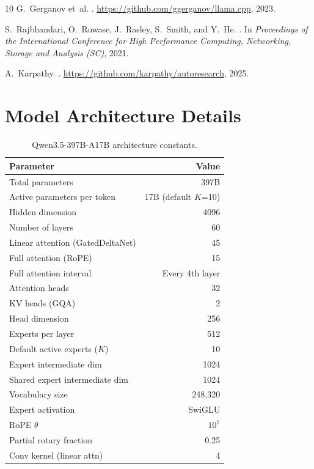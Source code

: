 \documentclass[11pt,twocolumn]{article}
\begin{document}
\begin{thebibliography}{10}
G.~Gerganov et~al.
.
\newblock \url{https://github.com/ggerganov/llama.cpp}, 2023.

S.~Rajbhandari, O.~Ruwase, J.~Rasley, S.~Smith, and Y.~He.
.
\newblock In \emph{Proceedings of the International Conference for High Performance Computing, Networking, Storage and Analysis (SC)}, 2021.

A.~Karpathy.
.
\newblock \url{https://github.com/karpathy/autoresearch}, 2025.

\end{thebibliography}

\appendix

\section{Model Architecture Details}

\begin{table}[h]
\centering
\small
\caption{Qwen3.5-397B-A17B architecture constants.}
\begin{tabular}{@{}lr@{}}
\toprule
\textbf{Parameter} & \textbf{Value} \\
\midrule
Total parameters & 397B \\
Active parameters per token & 17B (default $K$=10) \\
Hidden dimension & 4096 \\
Number of layers & 60 \\
\quad Linear attention (GatedDeltaNet) & 45 \\
\quad Full attention (RoPE) & 15 \\
Full attention interval & Every 4th layer \\
Attention heads & 32 \\
KV heads (GQA) & 2 \\
Head dimension & 256 \\
Experts per layer & 512 \\
Default active experts ($K$) & 10 \\
Expert intermediate dim & 1024 \\
Shared expert intermediate dim & 1024 \\
Vocabulary size & 248{,}320 \\
Expert activation & SwiGLU \\
RoPE $\theta$ & $10^7$ \\
Partial rotary fraction & 0.25 \\
Conv kernel (linear attn) & 4 \\
\bottomrule
\end{tabular}
\end{table}
\end{document}
